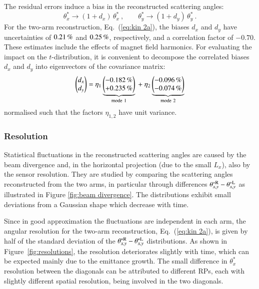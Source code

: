The residual errors induce a bias in the reconstructed scattering angles:
\begin{equation}
\label{eq:opt bias}
	\theta_x^* \rightarrow (1 + d_x)\, \theta_x^*\ ,\qquad
	\theta_y^* \rightarrow (1 + d_y)\, \theta_y^*\ .
\end{equation}
For the two-arm reconstruction, Eq.~(\ref{eq:kin 2a}), the biases $d_x$ and $d_y$ have uncertainties of $0.21\,{\rm \%}$ and $0.25\,{\rm \%}$, respectively, and a correlation factor of $-0.70$. These estimates include the effects of magnet field harmonics. For evaluating the impact on the $t$-distribution, it is convenient to decompose the correlated biases $d_x$ and $d_y$ into eigenvectors of the covariance matrix:
\begin{equation}
\label{eq:opt bias modes}
\begin{pmatrix} d_x\cr d_y \end{pmatrix} =
	\eta_1 \underbrace{\begin{pmatrix} -0.182\,{\rm \%} \cr +0.235\,{\rm \%} \end{pmatrix}}_{\rm mode\ 1}
	\ +\ \eta_2 \underbrace{\begin{pmatrix} -0.096\,{\rm \%} \cr -0.074\,{\rm \%} \end{pmatrix}}_{\rm mode\ 2}
\end{equation}
normalised such that the factors $\eta_{1,2}$ have unit variance.


\subsubsection{Resolution}
\label{sec:resolution}

Statistical fluctuations in the reconstructed scattering angles are caused by the beam divergence and, in the horizontal projection (due to the small $L_x$), also by the sensor resolution. They are studied by comparing the scattering angles reconstructed from the two arms, in particular through differences $\theta_{x,y}^{*\rm R} - \theta_{x,y}^{*\rm L}$ as illustrated in Figure \ref{fig:beam divergence}. The distributions exhibit small deviations from a Gaussian shape which decrease with time.

Since in good approximation the fluctuations are independent in each arm, the angular resolution for the two-arm reconstruction, Eq.~(\ref{eq:kin 2a}), is given by half of the standard deviation of the $\theta_{x,y}^{*\rm R} - \theta_{x,y}^{*\rm L}$ distributions. As shown in Figure~\ref{fig:resolutions}, the resolution deteriorates slightly with time, which can be expected mainly due to the emittance growth. The small difference in $\theta_x^*$ resolution between the diagonals can be attributed to different RPs, each with slightly different spatial resolution, being involved in the two diagonals.

